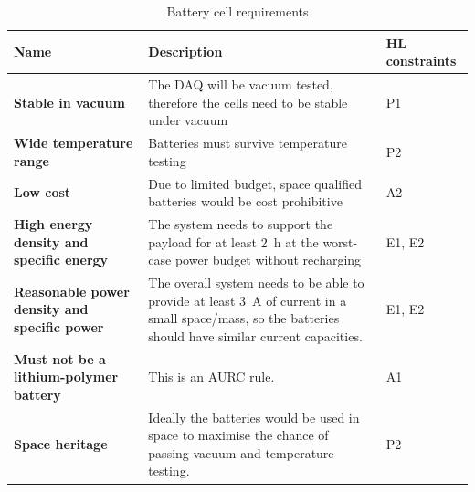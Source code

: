 \documentclass{report}
\begin{document}
\begin{table}[H]
  \centering
  \begin{tabular}{|L{0.2\textwidth}|L{0.495\textwidth}|L{0.2\textwidth}|}
    \hline
    \textbf{Name}                                        & \textbf{Description}                                                                                                                                               & \textbf{HL constraints} \\ \hline
    \textbf{Stable in vacuum}                            & The DAQ will be vacuum tested, therefore the cells need to be stable under vacuum                                                                                  & P1                      \\\hline
    \textbf{Wide temperature range}                      & Batteries must survive temperature testing                                                                                                                         & P2                      \\\hline
    \textbf{Low cost}                                    & Due to limited budget, space qualified batteries would be cost prohibitive                                                                                         & A2                      \\\hline
    \textbf{High energy density and specific energy}     & The system needs to support the payload for at least \SI{2}{\hour} at the worst-case power budget without recharging                                               & E1, E2                  \\\hline
    \textbf{Reasonable power density and specific power} & The overall system needs to be able to provide at least \SI{3}{\ampere} of current in a small space/mass, so the batteries should have similar current capacities. & E1, E2                  \\\hline
    \textbf{Must not be a lithium-polymer battery}       & This is an AURC rule.                                                                                                                                              & A1                      \\\hline
    \textbf{Space heritage}                              & Ideally the batteries would be used in space to maximise the chance of passing vacuum and temperature testing.                                                     & P2                      \\\hline
  \end{tabular}
  \caption{Battery cell requirements}
  \label{tabl:battery-requirements}
\end{table}
\end{document}

